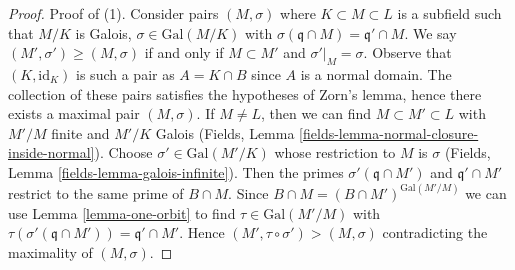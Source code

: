 \begin{proof}
Proof of (1). Consider pairs $(M, \sigma)$ where $K \subset M \subset L$
is a subfield such that $M/K$ is Galois, $\sigma \in \text{Gal}(M/K)$
with $\sigma(\mathfrak q \cap M) = \mathfrak q' \cap M$.
We say $(M', \sigma') \geq (M, \sigma)$ if and only if
$M \subset M'$ and $\sigma'|_M = \sigma$.
Observe that $(K, \text{id}_K)$ is such a pair as $A = K \cap B$
since $A$ is a normal domain.
The collection of these pairs satisfies the hypotheses of Zorn's lemma,
hence there exists a maximal pair $(M, \sigma)$.
If $M \not = L$, then we can find
$M \subset M' \subset L$ with $M'/M$ finite and $M'/K$ Galois
(Fields, Lemma \ref{fields-lemma-normal-closure-inside-normal}).
Choose $\sigma' \in \text{Gal}(M'/K)$ whose restriction to $M$
is $\sigma$ (Fields, Lemma \ref{fields-lemma-galois-infinite}).
Then the primes $\sigma'(\mathfrak q \cap M')$ and $\mathfrak q' \cap M'$
restrict to the same prime of $B \cap M$. Since
$B \cap M = (B \cap M')^{\text{Gal}(M'/M)}$ we can
use Lemma \ref{lemma-one-orbit} to find $\tau \in \text{Gal}(M'/M)$
with $\tau(\sigma'(\mathfrak q \cap M')) = \mathfrak q' \cap M'$.
Hence $(M', \tau \circ \sigma') > (M, \sigma)$
contradicting the maximality of $(M, \sigma)$.


\end{proof}
